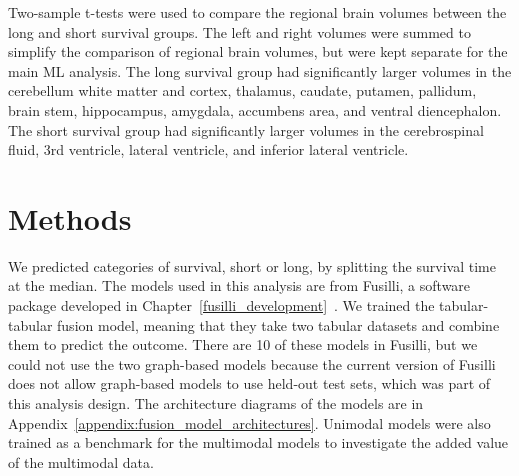 Two-sample t-tests were used to compare the regional brain volumes between the long and short survival groups.
The left and right volumes were summed to simplify the comparison of regional brain volumes, but were kept separate for the main ML analysis.
The long survival group had significantly larger volumes in the cerebellum white matter and cortex, thalamus, caudate, putamen, pallidum, brain stem, hippocampus, amygdala, accumbens area, and ventral diencephalon.
The short survival group had significantly larger volumes in the cerebrospinal fluid, 3rd ventricle, lateral ventricle, and inferior lateral ventricle.


\section{Methods}

We predicted categories of survival, short or long, by splitting the survival time at the median.
The models used in this analysis are from Fusilli, a software package developed in Chapter~\ref{fusilli_development}~\cite{townendFlorencejtFusilliFusilli2024}.
We trained the tabular-tabular fusion model, meaning that they take two tabular datasets and combine them to predict the outcome.
There are 10 of these models in Fusilli, but we could not use the two graph-based models because the current version of Fusilli does not allow graph-based models to use held-out test sets, which was part of this analysis design.
The architecture diagrams of the models are in Appendix~\ref{appendix:fusion_model_architectures}.
Unimodal models were also trained as a benchmark for the multimodal models to investigate the added value of the multimodal data.

